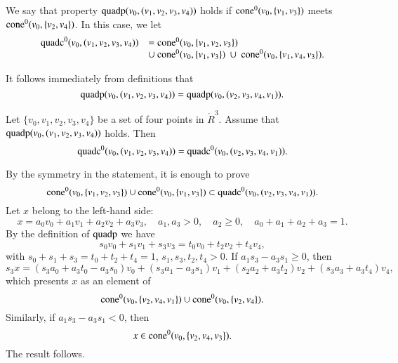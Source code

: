 \begin{tarskidata}
\begin{tarski}
\begin{definition}
We say that property ${\operatorname{quadp}}(v_0,(v_1,v_2,v_3,v_4))$  holds if
${\operatorname{cone}}^0(v_0,\{v_1,v_3\})$ meets ${\operatorname{cone}}^0(v_0,\{v_2,v_4\})$.
In this case, we let 
 $$
  \begin{array}{lll}
   \op{quadc}^0(v_0,(v_1,v_2,v_3,v_4))&= 
    \op{cone}^0(v_0,\{v_1,v_2,v_3\})  \\
    &\cup \ \op{cone}^0(v_0,\{v_1,v_3\})\ \cup \ 
   \op{cone}^0(v_0,\{v_1,v_4,v_3\}).
  \end{array}
  $$
\end{definition}
It follows immediately from definitions that
  $${\operatorname{quadp}}(v_0,(v_1,v_2,v_3,v_4))={\operatorname{quadp}}(v_0,(v_2,v_3,v_4,v_1)).$$
\end{tarski}





\begin{tarski}
\tag{pt5, quadp, quadc, cone}

\begin{lemma}
Let $\{v_0,v_1,v_2,v_3,v_4\}$ be a set of four points in $\ring{R}^3$.
Assume that ${\operatorname{quadp}}(v_0,(v_1,v_2,v_3,v_4))$ holds.
Then 
 $${\operatorname{quadc}}^0(v_0,(v_1,v_2,v_3,v_4))  
  = {\operatorname{quadc}}^0(v_0,(v_2,v_3,v_4,v_1)).
 $$
\end{lemma}

\begin{proved}
By the symmetry in the statement, it is enough to prove 
  $${\operatorname{cone}}^0(v_0,\{v_1,v_2,v_3\})\cup{\operatorname{cone}}^0(v_0,\{v_1,v_3\})
  \subset {\operatorname{quadc}}^0(v_0,(v_2,v_3,v_4,v_1)).$$
Let $x$ belong to the left-hand side:
  $$
  x = a_0 v_0 + a_1 v_1 + a_2 v_2 + a_3 v_3,
  \quad a_1,a_3 > 0,\quad a_2\ge 0,\quad a_0+a_1+a_2+a_3=1.
  $$
By the definition of ${\operatorname{quadp}}$ we have
$$
  s_0 v_0 + s_1 v_1 + s_3 v_3 = t_0 v_0 + t_2 v_2 + t_4 v_4,
$$
with $s_0 + s_1 + s_3 = t_0 + t_2 + t_4 = 1$, $s_1,s_3,t_2,t_4>0$.
If $a_1 s_3 - a_3 s_1 \ge 0$, then
  $$s_3 x = (s_3 a_0 + a_3 t_0 - a_3 s_0) v_0 + 
          (s_3 a_1 - a_3 s_1) v_1 + (s_2 a_2 + a_3 t_2) v_2 +
          (s_3 a_3 + a_3 t_4) v_4,$$
which presents $x$ as an element of 
 $$
 {\operatorname{cone}}^0(v_0,\{v_2,v_4,v_1\}) \cup{\operatorname{cone}}^0(v_0,\{v_2,v_4\}).
 $$
Similarly, if $a_1 s_3 - a_3 s_1 < 0$, then
  $$
  x\in {\operatorname{cone}}^0(v_0,\{v_2,v_4,v_3\}).
  $$
The result follows.
\swallowed\end{proved}
\end{tarski}







\end{tarskidata}
